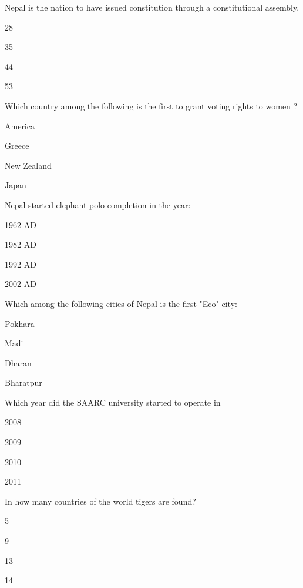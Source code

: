 \begin{questions}
\question Nepal is the \fillin[][2cm] nation to have issued constitution through a constitutional assembly.
  \begin{items}
  \item 28
  \item 35
  \item* 44
  \item 53
  \end{items}

\question Which country among the following is the first to grant voting rights to women ?
  \begin{items}
  \item America
  \item Greece
  \item* New Zealand
  \item Japan
  \end{items}

\question Nepal started elephant polo completion in the year:
  \begin{items}
  \item 1962 AD
  \item* 1982 AD
  \item 1992 AD
  \item 2002 AD
  \end{items}

\question Which among the following cities of Nepal is the first "Eco" city:
  \begin{items}
  \item Pokhara
  \item Madi
  \item Dharan
  \item* Bharatpur
  \end{items}

\question Which year did the SAARC university started to operate in
  \begin{items}
  \item 2008
  \item 2009
  \item* 2010
  \item 2011
  \end{items}

\question In how many countries of the world tigers are found?
  \begin{items}
  \item 5
  \item 9
  \item* 13
  \item 14
  \end{items}


\end{questions}
